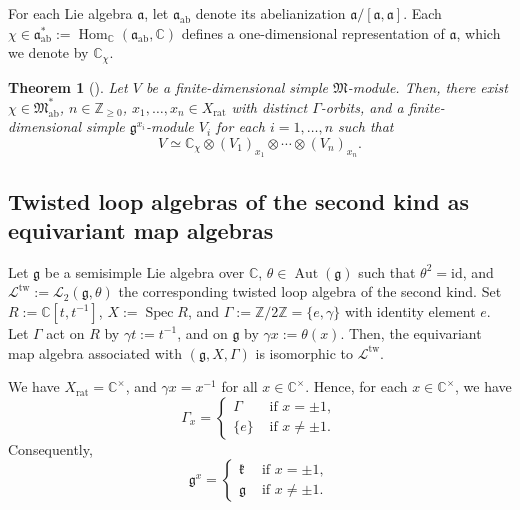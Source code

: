 \documentclass[12pt,a4paper]{amsart}
\newtheorem{thm}{Theorem}[subsection]
\theoremstyle{definition}
\numberwithin{equation}{subsection}
\begin{document}
For each Lie algebra $\mathfrak{a}$, let $\mathfrak{a}_\mathrm{ab}$ denote its abelianization $\mathfrak{a}/[\mathfrak{a},\mathfrak{a}]$.
Each $\chi \in \mathfrak{a}_\mathrm{ab}^* := \operatorname{Hom}_\mathbb{C}(\mathfrak{a}_\mathrm{ab},\mathbb{C})$ defines a one-dimensional representation of $\mathfrak{a}$, which we denote by $\mathbb{C}_\chi$.

\begin{thm}[{\cite[Theorem 5.5]{NSS12}}]\label{thm: classification fd irrep ema}
  Let $V$ be a finite-dimensional simple $\mathfrak{M}$-module.
  Then, there exist $\chi \in \mathfrak{M}_\mathrm{ab}^*$, $n \in \mathbb{Z}_{\geq 0}$, $x_1,\dots,x_n \in X_\mathrm{rat}$ with distinct $\Gamma$-orbits, and a finite-dimensional simple $\mathfrak{g}^{x_i}$-module $V_i$ for each $i = 1,\dots,n$ such that
  \[
    V \simeq \mathbb{C}_\chi \otimes (V_1)_{x_1} \otimes \cdots \otimes (V_n)_{x_n}.
  \]
\end{thm}


\subsection{Twisted loop algebras of the second kind as equivariant map algebras}\label{subsect: tla2 as ema}
Let $\mathfrak{g}$ be a semisimple Lie algebra over $\mathbb{C}$, $\theta \in \operatorname{Aut}(\mathfrak{g})$ such that $\theta^2 = \mathrm{id}$, and $\mathcal{L}^{\mathrm{tw}} := \mathcal{L}_2(\mathfrak{g},\theta)$ the corresponding twisted loop algebra of the second kind.
Set $R := \mathbb{C}[t,t^{-1}]$, $X := \operatorname{Spec} R$, and $\Gamma := \mathbb{Z}/2\mathbb{Z} = \{ e,\gamma \}$ with identity element $e$.
Let $\Gamma$ act on $R$ by $\gamma t := t^{-1}$, and on $\mathfrak{g}$ by $\gamma x := \theta(x)$.
Then, the equivariant map algebra associated with $(\mathfrak{g},X,\Gamma)$ is isomorphic to $\mathcal{L}^{\mathrm{tw}}$.

We have $X_\mathrm{rat} = \mathbb{C}^\times$, and $\gamma x = x^{-1}$ for all $x \in \mathbb{C}^\times$.
Hence, for each $x \in \mathbb{C}^\times$, we have
\[
  \Gamma_x = \begin{cases}
    \Gamma & \text{ if } x = \pm 1,\\
    \{ e \} & \text{ if } x \neq \pm 1.
  \end{cases}
\]
Consequently,
\[
  \mathfrak{g}^x = \begin{cases}
    \mathfrak{k} & \text{ if } x = \pm 1,\\
    \mathfrak{g} & \text{ if } x \neq \pm 1.
  \end{cases}
\]
\end{document}
